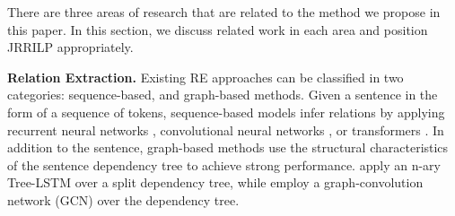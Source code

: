 
There are three areas of research that are related to the method we propose in this paper.
In this section, we discuss related work in each area and position JRRILP appropriately.

\textbf{Relation Extraction.}
Existing RE approaches can be classified in two categories: sequence-based, and graph-based methods.
Given a sentence in the form of a sequence of tokens, sequence-based models infer relations by applying recurrent neural networks \citep{zhou-etal-2016-attention, palstm}, convolutional neural networks \citep{zeng-etal-2014-relation, nguyen-grishman-2015-relation, wang-etal-2016-relation}, or transformers \citep{tre, bert-em}.
In addition to the sentence,
graph-based methods use the structural characteristics of the sentence dependency tree to achieve strong performance. \citep{peng2017} apply an n-ary Tree-LSTM \citep{treelstm} over a split dependency tree, while \citep{cgcn, aggcn} employ a graph-convolution network (GCN) over the dependency tree.

